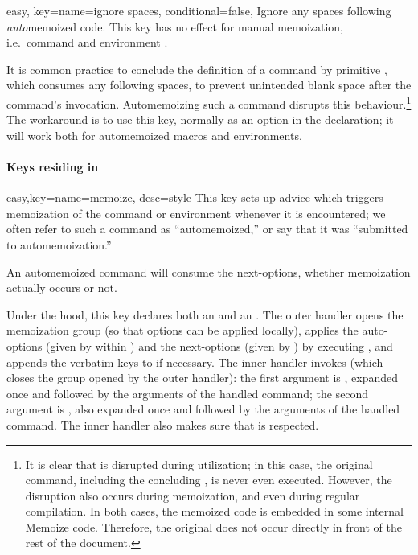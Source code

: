 \documentclass[a4paper,11pt]{article}
\begin{document}
\begin{doc}{easy, 
    key={name=ignore spaces, conditional=false},
  }
  Ignore any spaces following \emph{auto}memoized code.  This key has no effect
  for manual memoization, i.e.\ command  and environment
  .

  It is common practice to conclude the definition of a command by 
  primitive , which consumes any following spaces, to
  prevent unintended blank space after the command's invocation.  Automemoizing
  such a command disrupts this behaviour.\footnote{It is clear that
     is disrupted during utilization; in this case, the
    original command, including the concluding , is never even
    executed.  However, the disruption also occurs during memoization, and even
    during regular compilation.  In both cases, the memoized code is embedded
    in some internal Memoize code.  Therefore, the original 
    does not occur directly in front of the rest of the document.} The
  workaround is to use this key, normally as an option in the 
  declaration; it will work both for automemoized macros and environments.
\end{doc}

\paragraph{Keys residing in }

\begingroup
{}

\begin{doc}{easy,key={name=memoize, desc=style}}
  This key sets up advice which triggers memoization of the command or
  environment whenever it is encountered; we often refer to such a command as
  ``automemoized,'' or say that it was ``submitted to automemoization.''

  An automemoized command will consume the next-options, whether memoization
  actually occurs or not.

  Under the hood, this key declares both an  and an
  .  The outer handler opens the memoization group
  (so that options can be applied locally), applies the auto-options (given by
   within ) and the next-options (given by
  ) by executing , and appends the
  verbatim keys to  if necessary.  The inner
  handler invokes  (which closes the group opened by the outer
  handler): the first argument is , expanded once and
  followed by the arguments of the handled command; the second argument is
  , also expanded once and followed by the arguments of
  the handled command.  The inner handler also makes sure that  is respected.
\end{doc}
\end{document}
